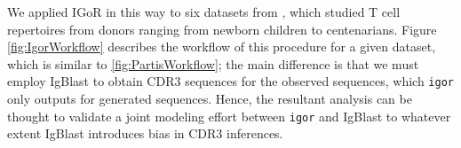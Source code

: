 \documentclass{article}
\begin{document}
We applied IGoR in this way to six datasets from \cite{Britanova2016-iw}, which studied T cell repertoires from donors ranging from newborn children to centenarians.
Figure \ref{fig:IgorWorkflow} describes the workflow of this procedure for a given dataset, which is similar to \ref{fig:PartisWorkflow}; the main difference is that we must employ IgBlast to obtain CDR3 sequences for the observed sequences, which \texttt{igor} only outputs for generated sequences.
Hence, the resultant analysis can be thought to validate a joint modeling effort between \texttt{igor} and IgBlast to whatever extent IgBlast introduces bias in CDR3 inferences.
\end{document}
